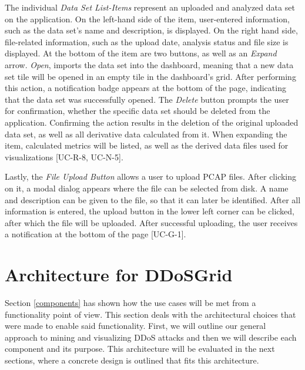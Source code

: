 The individual \emph{Data Set List-Items} represent an uploaded and analyzed data set on the application. On the left-hand side of the item, user-entered information, such as the data set's name and description, is displayed. On the right hand side, file-related information, such as the upload date, analysis status and file size is displayed. At the bottom of the item are two buttons, as well as an \emph{Expand} arrow. \emph{Open}, imports the data set into the dashboard, meaning that a new data set tile will be opened in an empty tile in the dashboard's grid. After performing this action, a notification badge appears at the bottom of the page, indicating that the data set was successfully opened. The \emph{Delete} button prompts the user for confirmation, whether the specific data set should be deleted from the application. Confirming the action results in the deletion of the original uploaded data set, as well as all derivative data calculated from it. When expanding the item, calculated metrics will be listed, as well as the derived data files used for visualizations [UC-R-8, UC-N-5].

Lastly, the \emph{File Upload Button} allows a user to upload PCAP files. After clicking on it, a modal dialog appears where the file can be selected from disk. A name and description can be given to the file, so that it can later be identified. After all information is entered, the upload button in the lower left corner can be clicked, after which the file will be uploaded. After successful uploading, the user receives a notification at the bottom of the page [UC-G-1].

\section{Architecture for DDoSGrid}
Section \ref{components} has shown how the use cases will be met from a functionality point of view. This section deals with the architectural choices that were made to enable said functionality. First, we will outline our general approach to mining and visualizing DDoS attacks and then we will describe each component and its purpose. This architecture will be evaluated in the next sections, where a concrete design is outlined that fits this architecture.

